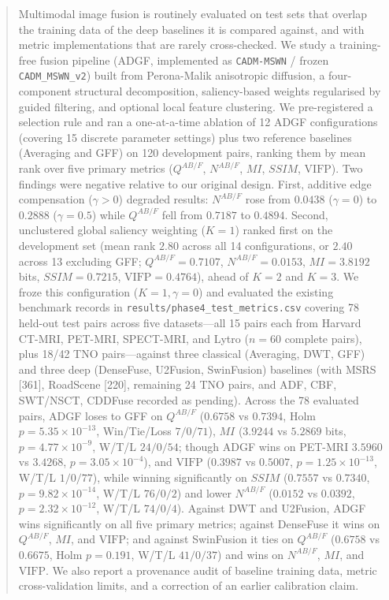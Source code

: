 \documentclass[conference]{IEEEtran}
\begin{document}
\begin{abstract}
Multimodal image fusion is routinely evaluated on test sets that overlap the training data of the deep baselines it is compared against, and with metric implementations that are rarely cross-checked. We study a training-free fusion pipeline (ADGF, implemented as \texttt{CADM-MSWN} / frozen \texttt{CADM\_MSWN\_v2}) built from Perona-Malik anisotropic diffusion, a four-component structural decomposition, saliency-based weights regularised by guided filtering, and optional local feature clustering. We pre-registered a selection rule and ran a one-at-a-time ablation of 12 ADGF configurations (covering 15 discrete parameter settings) plus two reference baselines (Averaging and GFF) on 120 development pairs, ranking them by mean rank over five primary metrics ($Q^{AB/F}$, $N^{AB/F}$, $MI$, $SSIM$, $\mathrm{VIFP}$). Two findings were negative relative to our original design. First, additive edge compensation ($\gamma > 0$) degraded results: $N^{AB/F}$ rose from $0.0438$ ($\gamma = 0$) to $0.2888$ ($\gamma = 0.5$) while $Q^{AB/F}$ fell from $0.7187$ to $0.4894$. Second, unclustered global saliency weighting ($K = 1$) ranked first on the development set (mean rank $2.80$ across all 14 configurations, or $2.40$ across 13 excluding GFF; $Q^{AB/F}=0.7107$, $N^{AB/F}=0.0153$, $MI=3.8192$ bits, $SSIM=0.7215$, $\mathrm{VIFP}=0.4764$), ahead of $K = 2$ and $K = 3$. We froze this configuration ($K=1, \gamma=0$) and evaluated the existing benchmark records in \texttt{results/phase4\_test\_metrics.csv} covering 78 held-out test pairs across five datasets---all 15 pairs each from Harvard CT-MRI, PET-MRI, SPECT-MRI, and Lytro ($n=60$ complete pairs), plus 18/42 TNO pairs---against three classical (Averaging, DWT, GFF) and three deep (DenseFuse, U2Fusion, SwinFusion) baselines (with MSRS [361], RoadScene [220], remaining 24 TNO pairs, and ADF, CBF, SWT/NSCT, CDDFuse recorded as pending). Across the 78 evaluated pairs, ADGF loses to GFF on $Q^{AB/F}$ ($0.6758$ vs $0.7394$, Holm $p = 5.35\times 10^{-13}$, Win/Tie/Loss $7/0/71$), $MI$ ($3.9244$ vs $5.2869$ bits, $p = 4.77\times 10^{-9}$, W/T/L $24/0/54$; though ADGF wins on PET-MRI $3.5960$ vs $3.4268$, $p=3.05\times 10^{-4}$), and $\mathrm{VIFP}$ ($0.3987$ vs $0.5007$, $p = 1.25\times 10^{-13}$, W/T/L $1/0/77$), while winning significantly on $SSIM$ ($0.7557$ vs $0.7340$, $p = 9.82\times 10^{-14}$, W/T/L $76/0/2$) and lower $N^{AB/F}$ ($0.0152$ vs $0.0392$, $p = 2.32\times 10^{-12}$, W/T/L $74/0/4$). Against DWT and U2Fusion, ADGF wins significantly on all five primary metrics; against DenseFuse it wins on $Q^{AB/F}$, $MI$, and $\mathrm{VIFP}$; and against SwinFusion it ties on $Q^{AB/F}$ ($0.6758$ vs $0.6675$, Holm $p=0.191$, W/T/L $41/0/37$) and wins on $N^{AB/F}$, $MI$, and $\mathrm{VIFP}$. We also report a provenance audit of baseline training data, metric cross-validation limits, and a correction of an earlier calibration claim.
\end{abstract}
\end{document}
